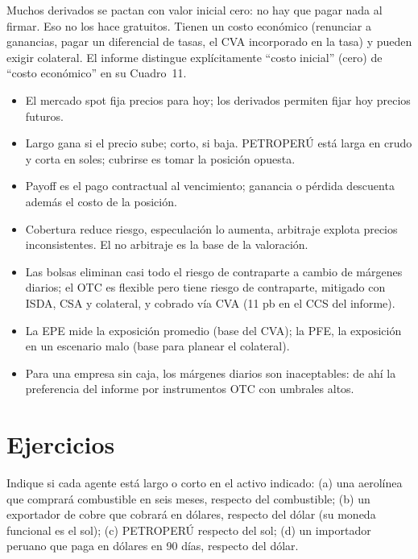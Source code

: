 \begin{cuidado}
Muchos derivados se pactan con valor inicial cero: no hay que pagar nada al firmar. Eso no los hace gratuitos. Tienen un costo económico (renunciar a ganancias, pagar un diferencial de tasas, el CVA incorporado en la tasa) y pueden exigir colateral. El informe distingue explícitamente \enquote{costo inicial} (cero) de \enquote{costo económico} en su Cuadro~11.
\end{cuidado}

\begin{resumen}
\begin{itemize}
\item El mercado spot fija precios para hoy; los derivados permiten fijar hoy precios futuros.
\item Largo gana si el precio sube; corto, si baja. PETROPERÚ está larga en crudo y corta en soles; cubrirse es tomar la posición opuesta.
\item Payoff es el pago contractual al vencimiento; ganancia o pérdida descuenta además el costo de la posición.
\item Cobertura reduce riesgo, especulación lo aumenta, arbitraje explota precios inconsistentes. El no arbitraje es la base de la valoración.
\item Las bolsas eliminan casi todo el riesgo de contraparte a cambio de márgenes diarios; el OTC es flexible pero tiene riesgo de contraparte, mitigado con ISDA, CSA y colateral, y cobrado vía CVA (11 pb en el CCS del informe).
\item La EPE mide la exposición promedio (base del CVA); la PFE, la exposición en un escenario malo (base para planear el colateral).
\item Para una empresa sin caja, los márgenes diarios son inaceptables: de ahí la preferencia del informe por instrumentos OTC con umbrales altos.
\end{itemize}
\end{resumen}

\section*{Ejercicios}

\ejercicio[conceptual] Indique si cada agente está largo o corto en el activo indicado: (a) una aerolínea que comprará combustible en seis meses, respecto del combustible; (b) un exportador de cobre que cobrará en dólares, respecto del dólar (su moneda funcional es el sol); (c) PETROPERÚ respecto del sol; (d) un importador peruano que paga en dólares en 90 días, respecto del dólar.

